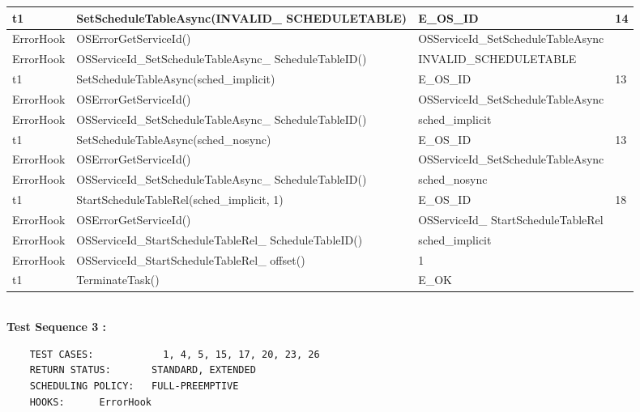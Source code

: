\documentclass[10pt]{article}
\newlength{\Li}\settowidth{\Li}{Running}
\newlength{\Lii}\setlength{\Lii}{7cm}
\newlength{\Liiii}\setlength{\Liiii}{0.9cm}
\newlength{\Liii}\setlength{\Liii}{\textwidth} \addtolength{\Liii}{-\Li} \addtolength{\Liii}{-\Lii} \addtolength{\Liii}{-\Liiii}
\begin{document}
\begin{supertabular}{|p{\Li}|p{\Lii}|p{\Liii}|p{\Liiii}|}
	t1		& SetScheduleTableAsync(INVALID\_ SCHEDULETABLE)					& E\_OS\_ID										& 14 \\ \hline
	ErrorHook	& OSErrorGetServiceId()												& OSServiceId\_SetScheduleTableAsync					& \\ \hline
	ErrorHook	& OSServiceId\_SetScheduleTableAsync\_ ScheduleTableID()				& INVALID\_SCHEDULETABLE		 				& \\ \hline
	
	t1		& SetScheduleTableAsync(sched\_implicit)								& E\_OS\_ID										& 13 \\ \hline
	ErrorHook	& OSErrorGetServiceId()												& OSServiceId\_SetScheduleTableAsync					& \\ \hline
	ErrorHook	& OSServiceId\_SetScheduleTableAsync\_ ScheduleTableID()				& sched\_implicit					 				& \\ \hline

	t1		& SetScheduleTableAsync(sched\_nosync)								& E\_OS\_ID										& 13 \\ \hline
	ErrorHook	& OSErrorGetServiceId()												& OSServiceId\_SetScheduleTableAsync					& \\ \hline
	ErrorHook	& OSServiceId\_SetScheduleTableAsync\_ ScheduleTableID()				& sched\_nosync					 				& \\ \hline
	
	t1		& StartScheduleTableRel(sched\_implicit, 1)								& E\_OS\_ID										& 18 \\ \hline
	ErrorHook	& OSErrorGetServiceId()												& OSServiceId\_ StartScheduleTableRel					& \\ \hline
	ErrorHook	& OSServiceId\_StartScheduleTableRel\_ ScheduleTableID()					& sched\_implicit									& \\ \hline
	ErrorHook	& OSServiceId\_StartScheduleTableRel\_ offset()							& 1												& \\ \hline

	t1		& TerminateTask()													& E\_OK											& \\ \hline
	\end{supertabular}\\

	\textbf{Test Sequence 3 :}
	\begin{lstlisting}
	TEST CASES:		       1, 4, 5, 15, 17, 20, 23, 26
	RETURN STATUS:	  	 STANDARD, EXTENDED
	SCHEDULING POLICY:   FULL-PREEMPTIVE
	HOOKS:		ErrorHook
	\end{lstlisting}
	
	
\end{document}
